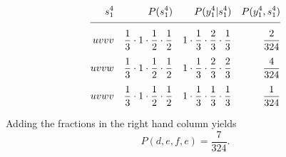 \documentclass[]{article}
\newcommand{\ts}[3]{#1_{#2}^{#3}}                    %
\begin{document}
\begin{subequations}
\label{eq:pcalc}
 \begin{align}
  \ts{s}{1}{4} & & P(\ts{s}{1}{4}) %
                & & P(\ts{y}{1}{4}|\ts{s}{1}{4}) %
                 & & P(\ts{y}{1}{4},\ts{s}{1}{4})\nonumber\\[1ex]
  \hline\nonumber\\[-2ex]
  uvvv         & & \frac{1}{3} \cdot 1 \cdot \frac{1}{2} \cdot \frac{1}{2} %
                & & 1 \cdot \frac{1}{3} \cdot \frac{2}{3} \cdot \frac{1}{3} %
                 & & \frac{2}{324}\\[1ex]
  uvvw         & & \frac{1}{3} \cdot 1 \cdot \frac{1}{2} \cdot \frac{1}{2} %
                & & 1 \cdot \frac{1}{3} \cdot \frac{2}{3} \cdot \frac{2}{3} %
                 & & \frac{4}{324}\\[1ex]
  uvwv         & & \frac{1}{3} \cdot 1 \cdot \frac{1}{2} \cdot \frac{1}{2} %
                & & 1 \cdot \frac{1}{3} \cdot \frac{1}{3} \cdot \frac{1}{3} %
                 & & \frac{1}{324}
 \end{align}
\end{subequations}

Adding the fractions in the right hand column yields %
\begin{equation*}
  P(d,e,f,e) = \frac{7}{324}.
\end{equation*}
\end{document}
